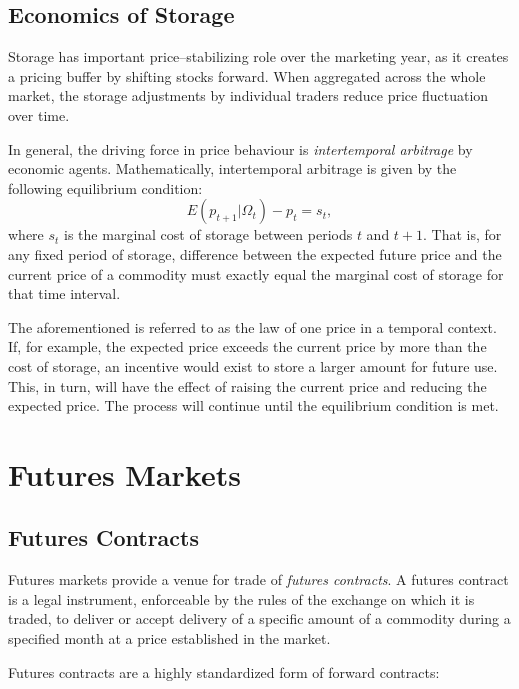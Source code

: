 \documentclass[
]{book}
\begin{document}
\hypertarget{economics-of-storage}{%
\section{Economics of Storage}\label{economics-of-storage}}

Storage has important price--stabilizing role over the marketing year, as it creates a pricing buffer by shifting stocks forward. When aggregated across the whole market, the storage adjustments by individual traders reduce price fluctuation over time.

In general, the driving force in price behaviour is \emph{intertemporal arbitrage} by economic agents. Mathematically, intertemporal arbitrage is given by the following equilibrium condition: \[E\left(p_{t+1}|\Omega_t\right)-p_{t} = s_t,\] where \(s_t\) is the marginal cost of storage between periods \(t\) and \(t+1\). That is, for any fixed period of storage, difference between the expected future price and the current price of a commodity must exactly equal the marginal cost of storage for that time interval.

The aforementioned is referred to as the law of one price in a temporal context. If, for example, the expected price exceeds the current price by more than the cost of storage, an incentive would exist to store a larger amount for future use. This, in turn, will have the effect of raising the current price and reducing the expected price. The process will continue until the equilibrium condition is met.

\hypertarget{futures-markets}{%
\chapter{Futures Markets}\label{futures-markets}}

\hypertarget{futures-contracts}{%
\section{Futures Contracts}\label{futures-contracts}}

Futures markets provide a venue for trade of \emph{futures contracts}. A futures contract is a legal instrument, enforceable by the rules of the exchange on which it is traded, to deliver or accept delivery of a specific amount of a commodity during a specified month at a price established in the market.

Futures contracts are a highly standardized form of forward contracts:
\end{document}
